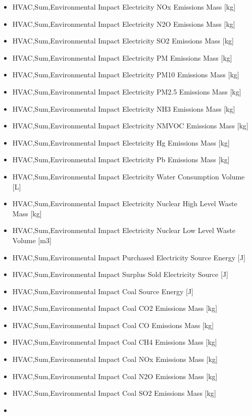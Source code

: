 \begin{itemize}
\item
  HVAC,Sum,Environmental Impact Electricity NOx Emissions Mass {[}kg{]}
\item
  HVAC,Sum,Environmental Impact Electricity N2O Emissions Mass {[}kg{]}
\item
  HVAC,Sum,Environmental Impact Electricity SO2 Emissions Mass {[}kg{]}
\item
  HVAC,Sum,Environmental Impact Electricity PM Emissions Mass {[}kg{]}
\item
  HVAC,Sum,Environmental Impact Electricity PM10 Emissions Mass {[}kg{]}
\item
  HVAC,Sum,Environmental Impact Electricity PM2.5 Emissions Mass {[}kg{]}
\item
  HVAC,Sum,Environmental Impact Electricity NH3 Emissions Mass {[}kg{]}
\item
  HVAC,Sum,Environmental Impact Electricity NMVOC Emissions Mass {[}kg{]}
\item
  HVAC,Sum,Environmental Impact Electricity Hg Emissions Mass {[}kg{]}
\item
  HVAC,Sum,Environmental Impact Electricity Pb Emissions Mass {[}kg{]}
\item
  HVAC,Sum,Environmental Impact Electricity Water Consumption Volume {[}L{]}
\item
  HVAC,Sum,Environmental Impact Electricity Nuclear High Level Waste Mass {[}kg{]}
\item
  HVAC,Sum,Environmental Impact Electricity Nuclear Low Level Waste Volume {[}m3{]}
\item
  HVAC,Sum,Environmental Impact Purchased Electricity Source Energy {[}J{]}
\item
  HVAC,Sum,Environmental Impact Surplus Sold Electricity Source {[}J{]}
\item
  HVAC,Sum,Environmental Impact Coal Source Energy {[}J{]}
\item
  HVAC,Sum,Environmental Impact Coal CO2 Emissions Mass {[}kg{]}
\item
  HVAC,Sum,Environmental Impact Coal CO Emissions Mass {[}kg{]}
\item
  HVAC,Sum,Environmental Impact Coal CH4 Emissions Mass {[}kg{]}
\item
  HVAC,Sum,Environmental Impact Coal NOx Emissions Mass {[}kg{]}
\item
  HVAC,Sum,Environmental Impact Coal N2O Emissions Mass {[}kg{]}
\item
  HVAC,Sum,Environmental Impact Coal SO2 Emissions Mass {[}kg{]}
\item

\end{itemize}
